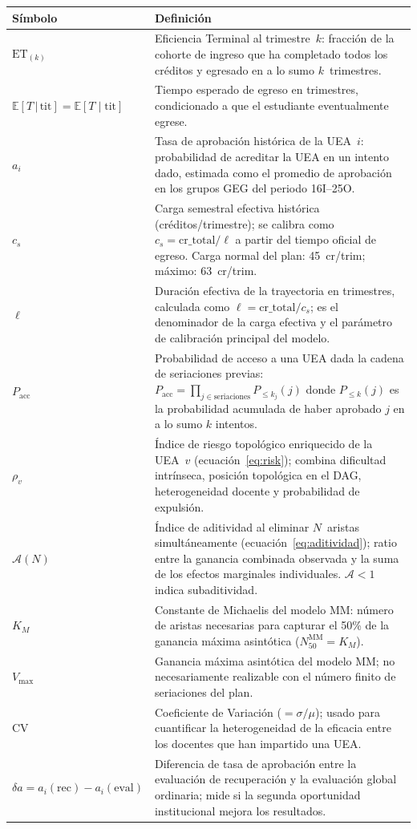 \documentclass[11pt,letterpaper]{article}
\newcommand{\ET}[1]{\mathrm{ET}_{(#1)}}
\newcommand{\ETtit}{\mathbb{E}[T\,|\,\mathrm{tit}]}
\newcommand{\Pacc}{P_{\mathrm{acc}}}
\begin{document}
\begin{tabularx}{\linewidth}{@{}lX@{}}
\toprule
Símbolo & Definición \\
\midrule
$\ET{k}$
  & Eficiencia Terminal al trimestre~$k$: fracción de la cohorte de ingreso
    que ha completado todos los créditos y egresado en a lo sumo $k$~trimestres. \\[4pt]
$\ETtit = \mathbb{E}[T\mid\mathrm{tit}]$
  & Tiempo esperado de egreso en trimestres, condicionado a que el
    estudiante eventualmente egrese. \\[4pt]
$a_i$
  & Tasa de aprobación histórica de la UEA~$i$: probabilidad de acreditar
    la UEA en un intento dado, estimada como el promedio de aprobación
    en los grupos GEG del periodo 16I--25O. \\[4pt]
$c_s$
  & Carga semestral efectiva histórica (créditos/trimestre); se calibra
    como $c_s = \mathrm{cr\_total}/\ell$ a partir del tiempo oficial de
    egreso. Carga normal del plan: 45~cr/trim; máximo: 63~cr/trim. \\[4pt]
$\ell$
  & Duración efectiva de la trayectoria en trimestres, calculada como
    $\ell = \mathrm{cr\_total}/c_s$; es el denominador de la carga
    efectiva y el parámetro de calibración principal del modelo. \\[4pt]
$\Pacc$
  & Probabilidad de acceso a una UEA dada la cadena de seriaciones previas:
    $\Pacc = \prod_{j\in\mathrm{seriaciones}} P_{\leq k_j}(j)$
    donde $P_{\leq k}(j)$ es la probabilidad acumulada de haber aprobado
    $j$ en a lo sumo $k$ intentos. \\[4pt]
$\rho_v$
  & Índice de riesgo topológico enriquecido de la UEA~$v$
    (ecuación~\ref{eq:risk}); combina dificultad intrínseca, posición
    topológica en el DAG, heterogeneidad docente y probabilidad de
    expulsión. \\[4pt]
$\mathcal{A}(N)$
  & Índice de aditividad al eliminar $N$~aristas simultáneamente
    (ecuación~\ref{eq:aditividad}); ratio entre la ganancia combinada
    observada y la suma de los efectos marginales individuales.
    $\mathcal{A}<1$ indica subaditividad. \\[4pt]
$K_M$
  & Constante de Michaelis del modelo MM: número de aristas necesarias
    para capturar el 50\% de la ganancia máxima asintótica
    ($N_{50}^{\mathrm{MM}}=K_M$). \\[4pt]
$V_{\max}$
  & Ganancia máxima asintótica del modelo MM; no necesariamente
    realizable con el número finito de seriaciones del plan. \\[4pt]
CV
  & Coeficiente de Variación ($= \sigma/\mu$); usado para cuantificar
    la heterogeneidad de la eficacia entre los docentes que han
    impartido una UEA. \\[4pt]
$\delta a = a_i(\mathrm{rec})-a_i(\mathrm{eval})$
  & Diferencia de tasa de aprobación entre la evaluación de recuperación
    y la evaluación global ordinaria; mide si la segunda oportunidad
    institucional mejora los resultados. \\
\bottomrule
\end{tabularx}
\end{document}
